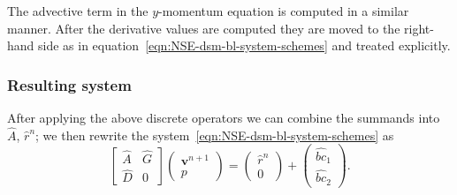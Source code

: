 \documentclass{article}
\begin{document}
The advective term in the $y$-momentum equation is computed in a similar manner. After the derivative values are computed they are moved to the right-hand side as in equation~\eqref{eqn:NSE-dsm-bl-system-schemes} and treated explicitly. 
\subsubsection{Resulting system}
After applying the above discrete operators we can combine the summands into $\hat{A}$, $\hat{r}^n$; we then rewrite the system~\eqref{eqn:NSE-dsm-bl-system-schemes}  as
\begin{equation}
	\begin{bmatrix}
		\hat{A} & \hat{G} \\
		\hat{D} & 0
	\end{bmatrix}
	\begin{pmatrix}
		\boldsymbol{v}^{n+1} \\ 
		p
	\end{pmatrix}
	=
	\begin{pmatrix}
		\hat{r}^n \\
		0
	\end{pmatrix}
	+
	\begin{pmatrix}
		\hat{bc}_1\\
		\hat{bc}_2
	\end{pmatrix}.
\end{equation}
\end{document}
